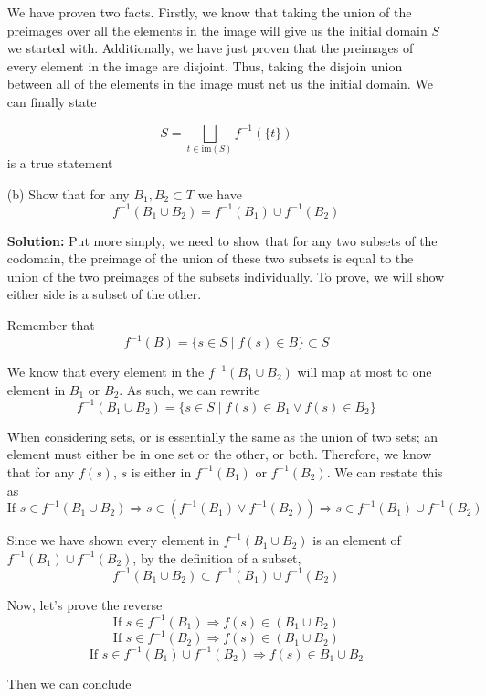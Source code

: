 \documentclass[hidelinks]{article}
\begin{document}
\begin{itemize}
        We have proven two facts. Firstly, we know that taking the union of the preimages over all the elements in the image will give us the initial domain $S$ we started with. Additionally, we have just proven that the preimages of every element in the image are disjoint. Thus, taking the disjoin union between all of the elements in the image must net us the initial domain. We can finally state 

        \[
            S = \bigsqcup_{t \in \text{im}(S)} f^{-1}(\{t\}) 
        \]
        is a true statement




    \item[(b)] Show that for any $B_1,B_2 \subset T$ we have $$f^{-1}(B_1 \cup B_2)=f^{-1}(B_1) \cup f^{-1}(B_2)$$ 
    \item[ ] \textbf{Solution:} Put more simply, we need to show that for any two subsets of the codomain, the preimage of the union of these two subsets is equal to the union of the two preimages of the subsets individually. To prove, we will show either side is a subset of the other.
    \item[ ] Remember that  
    \[
        f^{-1}(B) = \{s \in S \mid f(s) \in B\} \subset S
    \]
\item[ ] We know that every element in the $f^{-1}(B_1 \cup B_2)$ will map at most to one element in $B_1$ or $B_2$. As such, we can rewrite 
    \[
    f^{-1}(B_1 \cup B_2) = 
    \{s \in S \mid f(s) \in B_1 \lor f(s) \in B_2\} 
    \]
    \item[ ] When considering sets, or is essentially the same as the union of two sets; an element must either be in one set or the other, or both. Therefore, we know that for any $f(s)$, $s$ is either in $f^{-1}(B_1)$ 
        or $f^{-1}(B_2)$. We can restate this as 
    \[
        \text{If } s \in f^{-1}(B_1 \cup B_2) \Rightarrow s \in (f^{-1}(B_1) \lor f^{-1}(B_2)) \Rightarrow s \in f^{-1}(B_1) \cup  f^{-1}(B_2)
    \]
    \item[ ] Since we have shown every element in $f^{-1}(B_1 \cup B_2)$ is an element of $f^{-1}(B_1) \cup f^{-1}(B_2)$, by the definition of a subset, 
        \[
        f^{-1}(B_1 \cup B_2) \subset f^{-1}(B_1) \cup f^{-1}(B_2)
        \]
    \item[ ] Now, let's prove the reverse
        \[
            \text{If } s \in f^{-1}(B_1) \Rightarrow f(s) \in (B_1 \cup B_2) 
        \]
        \[
            \text{If } s \in f^{-1}(B_2) \Rightarrow f(s) \in (B_1 \cup B_2) 
        \]
        \[
            \text{If } s \in f^{-1}(B_1) \cup f^{-1}(B_2) \Rightarrow f(s) \in B_1 \cup B_2 
        \]
    \item[ ] Then we can conclude


\end{itemize}
\end{document}
